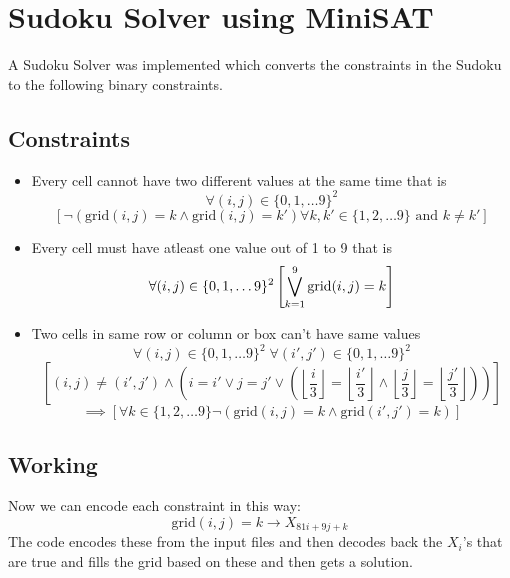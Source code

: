 \documentclass{article}
\begin{document}
\section{Sudoku Solver using MiniSAT}
A Sudoku Solver was implemented which converts the constraints in the Sudoku to the following binary constraints.
\subsection{Constraints}
\begin{itemize}
\item Every cell cannot have two different values at the same time that is $$\forall (i,j) \in \{0,1,\ldots9\}^2$$$$\left[\neg (\text{grid}(i,j)=k\wedge\text{grid}(i,j)=k')\forall k,k'\in\{1,2,\ldots9\}\text{ and }k\ne k'\right ]$$
\item Every cell must have atleast one value out of 1 to 9 that is $$\forall (i,j)  \in \{0,1,\ldots9\}^2\\\left[ \bigvee_{k=1}^9 \text{grid}(i,j)=k\right ]$$
\item Two cells in same row or column or box can't have same values $$\forall (i,j) \in \{0,1,\ldots9\}^2\; \forall (i',j')  \in \{0,1,\ldots9\}^2$$$$  \left[(i,j)\ne(i',j')\wedge \left(i=i'\vee j=j'\vee \left(\left\lfloor \frac i3\right\rfloor=\left\lfloor \frac {i'}3\right\rfloor\wedge \left\lfloor \frac j3\right\rfloor=\left\lfloor \frac {j'}3\right\rfloor\right)\right)\right]$$$$\implies\left[\forall k \in \{1,2,\ldots9\}\neg\left(\text{grid}(i,j)=k\wedge\text{grid}(i',j')=k\right)\right]$$
\end{itemize}

\subsection{Working}
Now we can encode each constraint in this way:
$$\text{grid}(i,j)=k\longrightarrow X_{81i+9j+k}$$
The code encodes these from the input files and then decodes back the $X_i$'s that are true and fills the grid based on these and then gets a solution.
\end{document}
